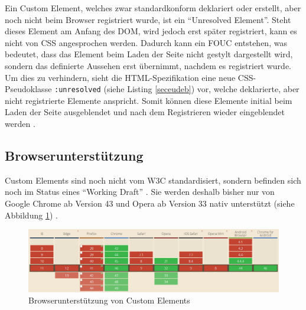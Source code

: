 Ein Custom Element, welches zwar standardkonform deklariert oder erstellt, aber noch nicht beim Browser registriert wurde, ist ein ``Unresolved Element''. Steht dieses Element am Anfang des \ac{DOM}, wird jedoch erst später registriert, kann es nicht von \ac{CSS} angesprochen werden. Dadurch kann ein \ac{FOUC} entstehen, was bedeutet, dass das Element beim Laden der Seite nicht gestylt dargestellt wird, sondern das definierte Aussehen erst übernimmt, nachdem es registriert wurde. Um dies zu verhindern, sieht die \ac{HTML}-Spezifikation eine neue \ac{CSS}-Pseudoklasse \texttt{:unresolved} (siehe Listing \ref{seceudeb}) vor, welche deklarierte, aber nicht registrierte Elemente anspricht. Somit können diese Elemente initial beim Laden der Seite ausgeblendet und nach dem Registrieren wieder eingeblendet werden \cite{citeulike:13844984}.



\subsection{Browserunterstützung}\label{custom-elements-browserunterstuetzung}

Custom Elements sind noch nicht vom \ac{W3C} standardisiert, sondern befinden sich noch im Status eines ``Working Draft'' \cite{citeulike:13845061}. Sie werden deshalb bisher nur von Google Chrome ab Version 43 und Opera ab Version 33 nativ unterstützt (siehe Abbildung \ref{fig:buce}) \cite{citeulike:13844983}.

\begin{figure}[htbp]
 \centering
 \includegraphics[width=\linewidth]{kapitel2/bilder/2-custom-elements-browserunterstuetzung}
 \caption{Browserunterstützung von Custom Elements}
 \label{fig:buce}
\end{figure}
